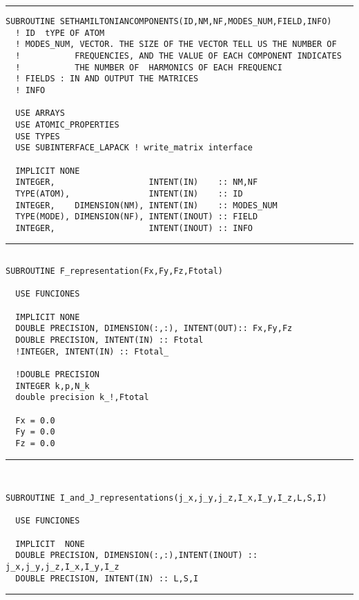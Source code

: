 \documentclass[10pt,a4paper]{article}
\begin{document}
\begin{center}
\rule{12cm}{1pt}
\end{center}
\begin{verbatim}
SUBROUTINE SETHAMILTONIANCOMPONENTS(ID,NM,NF,MODES_NUM,FIELD,INFO)
  ! ID  tYPE OF ATOM
  ! MODES_NUM, VECTOR. THE SIZE OF THE VECTOR TELL US THE NUMBER OF 
  !           FREQUENCIES, AND THE VALUE OF EACH COMPONENT INDICATES
  !           THE NUMBER OF  HARMONICS OF EACH FREQUENCI
  ! FIELDS : IN AND OUTPUT THE MATRICES
  ! INFO

  USE ARRAYS
  USE ATOMIC_PROPERTIES
  USE TYPES
  USE SUBINTERFACE_LAPACK ! write_matrix interface

  IMPLICIT NONE
  INTEGER,                   INTENT(IN)    :: NM,NF
  TYPE(ATOM),                INTENT(IN)    :: ID
  INTEGER,    DIMENSION(NM), INTENT(IN)    :: MODES_NUM
  TYPE(MODE), DIMENSION(NF), INTENT(INOUT) :: FIELD
  INTEGER,                   INTENT(INOUT) :: INFO

\end{verbatim}
\begin{center}
\rule{12cm}{1pt}
\end{center}
\begin{verbatim}

SUBROUTINE F_representation(Fx,Fy,Fz,Ftotal)

  USE FUNCIONES
  
  IMPLICIT NONE
  DOUBLE PRECISION, DIMENSION(:,:), INTENT(OUT):: Fx,Fy,Fz
  DOUBLE PRECISION, INTENT(IN) :: Ftotal
  !INTEGER, INTENT(IN) :: Ftotal_

  !DOUBLE PRECISION
  INTEGER k,p,N_k
  double precision k_!,Ftotal

  Fx = 0.0
  Fy = 0.0 
  Fz = 0.0
\end{verbatim}
\begin{center}
\rule{12cm}{1pt}
\end{center}
\begin{verbatim}


SUBROUTINE I_and_J_representations(j_x,j_y,j_z,I_x,I_y,I_z,L,S,I)

  USE FUNCIONES
  
  IMPLICIT  NONE
  DOUBLE PRECISION, DIMENSION(:,:),INTENT(INOUT) :: j_x,j_y,j_z,I_x,I_y,I_z
  DOUBLE PRECISION, INTENT(IN) :: L,S,I
\end{verbatim}
\begin{center}
\rule{12cm}{1pt}
\end{center}
\end{document}
